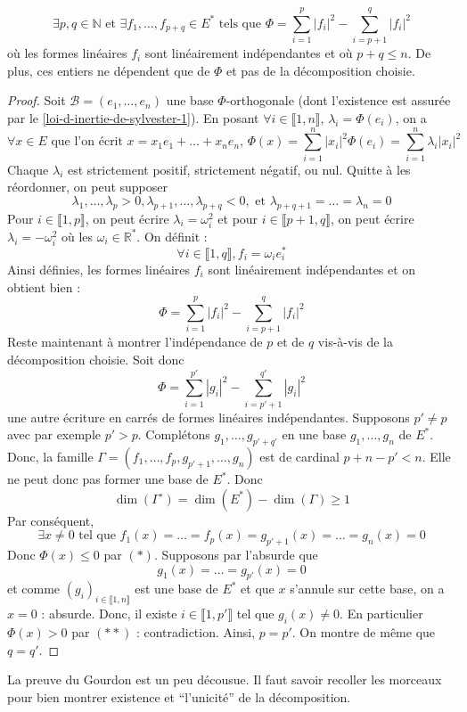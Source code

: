 	\begin{theorem}
		\[ \exists p, q \in \mathbb{N} \text{ et } \exists f_1, \dots, f_{p+q} \in E^* \text{ tels que } \Phi = \sum_{i=1}^p |f_i|^2 - \sum_{i=p+1}^q |f_i|^2 \]
		où les formes linéaires $f_i$ sont linéairement indépendantes et où $p + q \leq n$. De plus, ces entiers ne dépendent que de $\Phi$ et pas de la décomposition choisie.
	\end{theorem}

	\begin{proof}
		Soit $\mathcal{B} = (e_1, \dots, e_n)$ une base $\Phi$-orthogonale (dont l'existence est assurée par le \cref{loi-d-inertie-de-sylvester-1}). En posant $\forall i \in \llbracket 1, n \rrbracket$, $\lambda_i = \Phi(e_i)$, on a
		\[ \forall x \in E \text{ que l'on écrit } x = x_1 e_1 + \dots + x_n e_n, \, \Phi(x) = \sum_{i=1}^n |x_i|^2 \Phi(e_i) = \sum_{i=1}^n \lambda_i |x_i|^2 \]
		Chaque $\lambda_i$ est strictement positif, strictement négatif, ou nul. Quitte à les réordonner, on peut supposer
		\[ \lambda_1, \dots, \lambda_p > 0, \lambda_{p+1}, \dots, \lambda_{p+q} < 0, \text{ et } \lambda_{p+q+1} = \dots = \lambda_n = 0 \]
		Pour $i \in \llbracket 1, p \rrbracket$, on peut écrire $\lambda_i = \omega_i^2$ et pour $i \in \llbracket p+1, q \rrbracket$, on peut écrire $\lambda_i = -\omega_i^2$ où les $\omega_i \in \mathbb{R}^*$. On définit :
		\[ \forall i \in \llbracket 1, q \rrbracket, f_i = \omega_i e_i^* \]
		Ainsi définies, les formes linéaires $f_i$ sont linéairement indépendantes et on obtient bien :
		\[ \Phi = \sum_{i=1}^p |f_i|^2 - \sum_{i=p+1}^q |f_i|^2 \tag{$*$} \]
		Reste maintenant à montrer l'indépendance de $p$ et de $q$ vis-à-vis de la décomposition choisie. Soit donc
		\[ \Phi = \sum_{i=1}^{p'} |g_i|^2 - \sum_{i=p'+1}^{q'} |g_i|^2 \tag{$**$} \]
		une autre écriture en carrés de formes linéaires indépendantes. Supposons $p' \neq p$ avec par exemple $p' > p$. Complétons $g_1, \dots, g_{p'+q'}$ en une base $g_1, \dots, g_n$ de $E^*$. Donc, la famille $\Gamma = (f_1, \dots, f_p, g_{p'+1}, \dots, g_n)$ est de cardinal $p + n - p' < n$. Elle ne peut donc pas former une base de $E^*$. Donc
		\[ \dim(\Gamma^\circ) = \dim(E^*) - \dim(\Gamma) \geq 1 \]
		Par conséquent,
		\[ \exists x \neq 0 \text{ tel que } f_1(x) = \dots = f_p(x) = g_{p'+1}(x) = \dots = g_n(x) = 0 \]
		Donc $\Phi(x) \leq 0$ par $(*)$. Supposons par l'absurde que
		\[ g_1(x) = \dots = g_{p'}(x) = 0 \]
		et comme $(g_i)_{i \in \llbracket 1, n \rrbracket}$ est une base de $E^*$ et que $x$ s'annule sur cette base, on a $x = 0$ : absurde. Donc, il existe $i \in \llbracket 1, p' \rrbracket$ tel que $g_i(x) \neq 0$. En particulier $\Phi(x) > 0$ par $(**)$ : contradiction. Ainsi, $p = p'$. On montre de même que $q = q'$.
	\end{proof}

	\begin{remark}
		La preuve du Gourdon est un peu décousue. Il faut savoir recoller les morceaux pour bien montrer existence et ``l'unicité'' de la décomposition.
	\end{remark}

